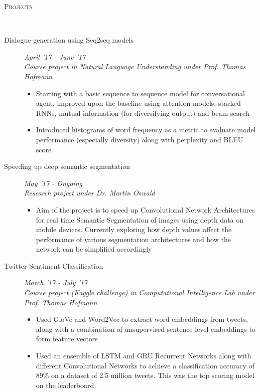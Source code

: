 \documentclass[9pt]{article}
\newenvironment{changemargin}[2]{%
  \begin{list}{}{%
    \setlength{\topsep}{0pt}%
    \setlength{\leftmargin}{#1}%
    \setlength{\rightmargin}{#2}%
    \setlength{\listparindent}{\parindent}%
    \setlength{\itemindent}{\parindent}%
    \setlength{\parsep}{\parskip}%
  }%
  \item[]}{\end{list}
}
\newcommand{\lineover}{
	\begin{changemargin}{-0.05in}{-0.10in}
		\vspace*{-9pt}
		\hrulefill \\
		\vspace*{-2pt}
	\end{changemargin}
}
\newcommand{\header}[1]{
	\begin{changemargin}{-0.5in}{-0.5in}
		\scshape{#1}\\
  	\lineover
	\end{changemargin}
}
\newenvironment{body} {
	\vspace*{-16pt}
	\begin{changemargin}{-0.6in}{-0.65in}
  }	
	{\end{changemargin}
}
\begin{document}
\header{Projects}
\begin{body}
	\vspace{14pt}
	
	\begin{description}
      
      \item[\normalsize{Dialogue generation using Seq2seq models}]
      \hfill \textit{April '17 - June '17} \\
      \textit{Course project in Natural Language Understanding under Prof. Thomas Hofmann}
      \begin{itemize}
      	\item Starting with a basic sequence to sequence model for conversational agent,
      	improved upon the baseline using attention models, stacked RNNs, mutual information (for diversifying output) and beam search
      	\item Introduced histograms of word frequency as a metric to evaluate model 
      	performance (especially diversity) along with perplexity and BLEU score
      \end{itemize}
      
     \item[\normalsize{Speeding up deep semantic segmentation}]
     \hfill \textit{May '17 - Ongoing} \\
     \textit{Research project under Dr. Martin Oswald}
     \begin{itemize}
     	\item Aim of the project is to speed up Convolutional Network Architectures for
     	real time Semantic Segmentation of images using depth data on mobile devices. Currently exploring how depth values affect the performance of various
     	segmentation architectures and how the network can be simplified accordingly
     \end{itemize}
      
     \item[\normalsize{Twitter Sentiment Classification}] 
     \hfill	 \textit{March '17 - July '17} \\
     \textit{Course project (Kaggle challenge) in Computational Intelligence Lab under Prof. Thomas Hofmann}
     \begin{itemize}
     	\item Used GloVe and Word2Vec to extract word embeddings from tweets, along
     	with a combination of unsupervised sentence level embeddings to form feature
     	vectors
     	\item Used an ensemble of LSTM and GRU Recurrent Networks along with different Convolutional Networks to achieve a classification accuracy of 89\% on a dataset of 2.5 million tweets. This was the top scoring model on the leaderboard. 
     \end{itemize}
 

\end{description}
\end{body}
\end{document}
